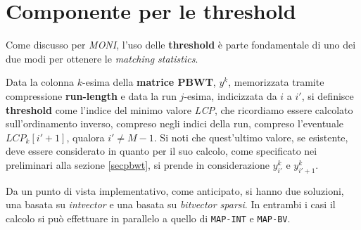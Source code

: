 \section{Componente per le threshold}
Come discusso per \textit{MONI}, l'uso delle \textbf{threshold} è parte
fondamentale di uno dei due modi per ottenere le \textit{matching
  statistics}. \\
\begin{definizione}
  Data la colonna $k$-esima della \textbf{matrice PBWT}, $y^k$, memorizzata
  tramite compressione \textbf{run-length} e data la run $j$-esima, indicizzata
  da $i$ a $i'$, si definisce \textbf{threshold} come l'indice del minimo valore
  \textit{LCP}, che ricordiamo essere calcolato sull'ordinamento inverso,
  compreso negli indici della run, compreso l'eventuale 
  $LCP_k[i'+1]$, qualora $i'\neq M-1$. Si noti che quest'ultimo valore, se
  esistente, deve essere considerato in quanto per il suo calcolo, come
  specificato nei preliminari alla sezione \ref{secpbwt}, si prende in
  considerazione $y^k_{i'}$ e $y^k_{i'+1}$.
\end{definizione}
Da un punto di vista implementativo, come anticipato, si hanno due soluzioni,
una basata su \textit{intvector} e una basata su \textit{bitvector sparsi}. In
entrambi i casi il calcolo si può effettuare in parallelo a quello di
\texttt{MAP-INT} e \texttt{MAP-BV}.
